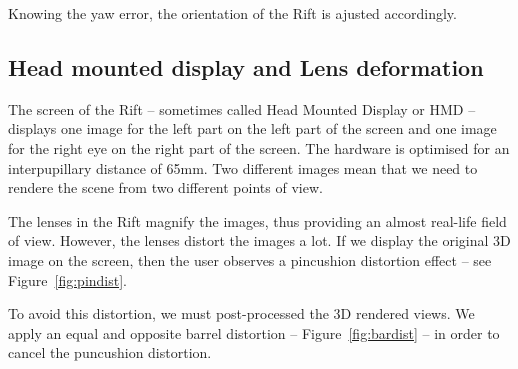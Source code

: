 \documentclass[12pt]{article}
\begin{document}
Knowing the yaw error, the orientation of the Rift is ajusted accordingly.

\subsection{Head mounted display and Lens deformation}
\label{subsec:lensdef}
The screen of the Rift -- sometimes called Head Mounted Display or HMD -- displays one image for the left part on the left part of the screen and one image for the right eye on the right part of the screen. The hardware is optimised for an interpupillary distance of 65mm. Two different images mean that we need to rendere the scene from two different points of view.

The lenses in the Rift magnify the images, thus providing an almost real-life field of view. However, the lenses distort the images a lot. If we display the original 3D image on the screen, then the user observes a pincushion distortion effect \cite{OVRDoc} -- see Figure~\ref{fig:pindist}.

To avoid this distortion, we must post-processed the 3D rendered views. We apply an equal and opposite barrel distortion -- Figure~\ref{fig:bardist} -- in order to cancel the puncushion distortion.
\end{document}
